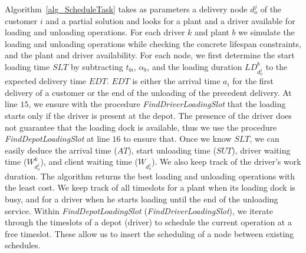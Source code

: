 \documentclass{article}
\begin{document}
 Algorithm~\ref{alg_ScheduleTask} takes as parameters a delivery node $d^j_{o}$ of the customer $i$ and a partial solution and looks for a plant and a driver available for loading and unloading operations. For each driver $k$ and plant $b$ we simulate the loading and unloading operations while checking the concrete lifespan constraints, and the plant and driver availability. For each node, we first determine the start loading time $SLT$ by subtracting $t_{bi}$, $\alpha_b$, and the loading duration $LD^b_{d^j_{o}}$ to the expected delivery time $EDT$. $EDT$ is either the arrival time $a_i$ for the first delivery of a customer or the end of the unloading of the precedent delivery. At line $15$, we ensure with the procedure \textit{ FindDriverLoadingSlot} that the loading starts only if the driver is present at the depot. The presence of the driver does not guarantee that the loading dock is available, thus we use the procedure \textit{FindDepotLoadingSlot} at line $16$ to ensure that. Once we know $SLT$, we can easily deduce the arrival time ($AT$), start unloading time ($SUT$), driver waiting time ($W^k_{d^j_o}$), and client waiting time ($W_{d^j_o}$). We also keep track of the driver's work duration. The algorithm returns the best loading and unloading operations with the least cost.  
 We keep track of all timeslots for a plant when its loading dock is busy, and for a driver when he starts loading until the end of the unloading service. Within \textit{FindDepotLoadingSlot} (\textit{FindDriverLoadingSlot}), we iterate through the timeslots of a depot (driver) to schedule the current operation at a free timeslot. These allow us to insert the scheduling of a node between existing schedules.
 
\end{document}
